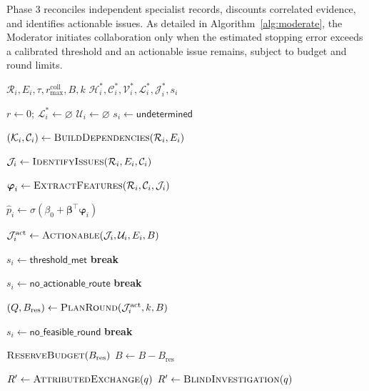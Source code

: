 Phase 3 reconciles independent specialist records,
discounts correlated evidence, and identifies
actionable issues. As detailed in
Algorithm~\ref{alg:moderate}, the Moderator
initiates collaboration only when the estimated
stopping error exceeds a calibrated threshold
and an actionable issue remains, subject to
budget and round limits.


\begin{algorithm}[!t]
\caption{Provenance-Aware Adaptive Collaboration}
\label{alg:moderate}
\footnotesize
\begin{algorithmic}[1]
\Require $\mathcal R_i,E_i,\tau,
r_{\max}^{\mathrm{coll}},B,k$
\Ensure $\mathcal H_i^*,\mathcal C_i^*,
\mathcal V_i^*,\mathcal L_i^*,
\mathcal J_i^*,s_i$

\State $r\gets0$;
$\mathcal L_i^*\gets\varnothing$
\State $\mathcal U_i\gets\varnothing$
\State $s_i\gets\mathsf{undetermined}$


    \State $(\mathcal K_i,\mathcal C_i)
    \gets\Call{BuildDependencies}{\mathcal R_i,E_i}$

    \State $\mathcal J_i\gets
    \Call{IdentifyIssues}{
    \mathcal R_i,E_i,\mathcal C_i}$

    \State $\boldsymbol{\varphi}_i\gets
    \Call{ExtractFeatures}{
    \mathcal R_i,\mathcal C_i,\mathcal J_i}$

    \State $\widehat p_i\gets
    \sigma(\beta_0+
    \boldsymbol{\beta}^{\top}
    \boldsymbol{\varphi}_i)$

    \State $\mathcal J_i^{\mathrm{act}}\gets
    \Call{Actionable}{
    \mathcal J_i,\mathcal U_i,E_i,B}$

        \State $s_i\gets\mathsf{threshold\_met}$
        \State \textbf{break}
    \EndIf

        \State $s_i\gets\mathsf{no\_actionable\_route}$
        \State \textbf{break}
    \EndIf

    \State $(Q,B_{\mathrm{res}})
    \gets\Call{PlanRound}{
    \mathcal J_i^{\mathrm{act}},k,B}$

        \State $s_i\gets\mathsf{no\_feasible\_round}$
        \State \textbf{break}
    \EndIf

    \State $\Call{ReserveBudget}{
    B_{\mathrm{res}}}$
    \State $B\gets B-B_{\mathrm{res}}$

            \State $R'\gets
            \Call{AttributedExchange}{q}$
        \Else
            \State $R'\gets
            \Call{BlindInvestigation}{q}$
        \EndIf


\end{algorithmic}
\end{algorithm}
